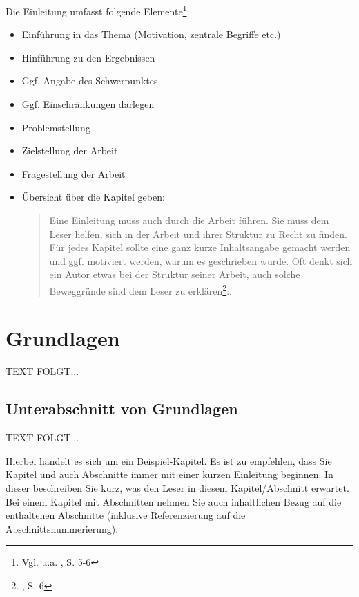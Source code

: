 \documentclass[a4paper,12pt,oneside]{article}
\begin{document}
    \vspace{1cm}
 \begin{tcolorbox}[title={Die Einleitung}]
Die Einleitung umfasst folgende Elemente\footnote{Vgl. u.a. \cite{BBoJ}, S. 5-6}:
\begin{itemize}
 \item Einführung in das Thema (Motivation, zentrale Begriffe etc.)
 \item Hinführung zu den Ergebnissen
 \item Ggf. Angabe des Schwerpunktes
 \item Ggf. Einschränkungen darlegen
 \item Problemstellung
 \item Zielstellung der Arbeit
 \item Fragestellung der Arbeit
 \item Übersicht über die Kapitel geben: 
\begin{quotation}
Eine Einleitung muss auch durch die Arbeit führen. Sie muss dem Leser helfen, sich in der Arbeit und ihrer Struktur zu Recht zu finden. Für jedes Kapitel sollte eine ganz kurze Inhaltsangabe gemacht werden und ggf. motiviert werden, warum es geschrieben wurde. Oft denkt sich ein Autor etwas bei der Struktur seiner Arbeit, auch solche Beweggründe sind dem Leser zu erklären\footnote{\cite{BBoJ}, S. 6}:. 
\end{quotation}
\end{itemize}
  \end{tcolorbox}
   
  \newpage  
  \section{Grundlagen}\label{kap_grundlagen}  
    TEXT FOLGT...
   
    \subsection{Unterabschnitt von Grundlagen}\label{subsec_UabsGrundl}
     TEXT FOLGT... 
     
    \vspace{1cm}
 \begin{tcolorbox}[title={Das Kapitel/der Abschnitt}]
Hierbei handelt es sich um ein Beispiel-Kapitel. Es ist zu empfehlen, dass Sie Kapitel und auch Abschnitte immer mit einer kurzen Einleitung beginnen. In dieser beschreiben Sie kurz, was den Leser in diesem Kapitel/Abschnitt erwartet. Bei einem Kapitel mit Abschnitten nehmen Sie auch inhaltlichen Bezug auf die enthaltenen Abschnitte (inklusive Referenzierung auf die Abschnittsnummerierung).
  \end{tcolorbox}
  
\end{document}
